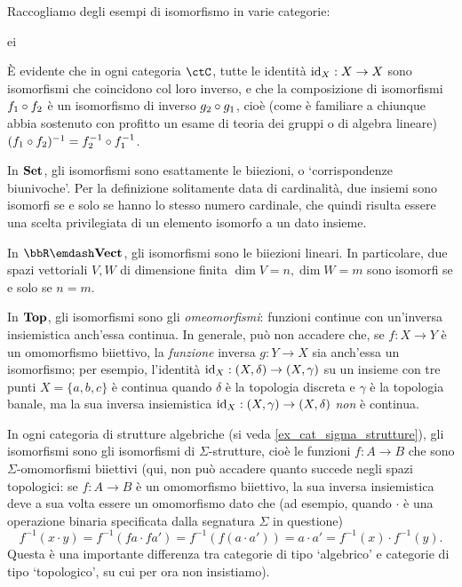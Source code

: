 \begin{examples}
	Raccogliamo degli esempi di isomorfismo in varie categorie:%
	\begin{enumtag}{ei}
		\item \`E evidente che in ogni categoria \(\ctC\), tutte le identità \(\mathrm{id}_X : X\to X\) sono isomorfismi che coincidono col loro inverso, e che la composizione di isomorfismi \(f_1\circ f_2\) è un isomorfismo di inverso \(g_2\circ g_1\), cioè (come è familiare a chiunque abbia sostenuto con profitto un esame di teoria dei gruppi o di algebra lineare) \((f_1\circ f_2)^{-1} = f_2^{-1}\circ f_1^{-1}\).
		\item In \(\mathbf{Set}\), gli isomorfismi sono esattamente le biiezioni, o `corrispondenze biunivoche'. Per la definizione solitamente data di cardinalità, due insiemi sono isomorfi se e solo se hanno lo stesso numero cardinale, che quindi risulta essere una scelta privilegiata di un elemento isomorfo a un dato insieme.
		\item In \(\bbR\emdash\ctVect\), gli isomorfismi sono le biiezioni lineari. In particolare, due spazi vettoriali \(V,W\) di dimensione finita \(\dim V=n,\dim W=m\) sono isomorfi se e solo se \(n=m\).
		\item In \(\mathbf{Top}\), gli isomorfismi sono gli \emph{omeomorfismi}: funzioni continue con un'inversa insiemistica anch'essa continua. In generale, può non accadere che, se \(f : X\to Y\) è un omomorfismo biiettivo, la \emph{funzione} inversa \(g : Y\to X\) sia anch'essa un isomorfismo; per esempio, l'identità \(\mathrm{id}_X : (X,\delta)\to (X,\gamma)\) su un insieme con tre punti \(X=\{a,b,c\}\) è continua quando \(\delta\) è la topologia discreta e \(\gamma\) è la topologia banale, ma la sua inversa insiemistica \(\mathrm{id}_X : (X,\gamma)\to(X,\delta)\) \emph{non} è continua.
		\item In ogni categoria di strutture algebriche (si veda \ref{ex_cat_sigma_strutture}), gli isomorfismi sono gli isomorfismi di \(\Sigma\)-strutture, cioè le funzioni \(f : A\to B\) che sono \(\Sigma\)-omomorfismi biiettivi (qui, non può accadere quanto succede negli spazi topologici: se $f : A\to B$ è un omomorfismo biiettivo, la sua inversa insiemistica deve a sua volta essere un omomorfismo dato che (ad esempio, quando $\cdot$ è una operazione binaria specificata dalla segnatura $\Sigma$ in questione)
      \[f^{-1}(x\cdot y) = f^{-1}(fa\cdot fa') = f^{-1}(f(a\cdot a')) = a\cdot a' = f^{-1}(x)\cdot f^{-1}(y).\]
      Questa è una importante differenza tra categorie di tipo `algebrico' e categorie di tipo `topologico', su cui per ora non insistiamo). 
	\end{enumtag}
\end{examples}
